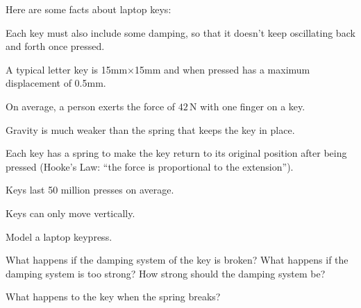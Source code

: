 \newpage

\question
	Here are some facts about laptop keys:

\begin{itemize}
\begin{minipage}{.4\textwidth}
\item[\color{Gray}(da)] Each key must also include some damping, so that it doesn't keep oscillating back and forth once pressed.

\item[\color{Gray}(di)] A typical letter key is 15mm$\times$15mm and when pressed has a maximum displacement of 0.5mm.

\item[\color{Gray}(fo)] On average, a person exerts the force of $42\,$N with one finger on a key.
\end{minipage}
\hfill
\begin{minipage}{.4\textwidth}
\item[\color{Gray}(gr)] Gravity is much weaker than the spring that keeps the key in place.

\item[\color{Gray}(hl)] Each key has a spring to make the key return to its original position after being pressed (Hooke's Law: ``the force is proportional to the extension'').

\item[\color{Gray}(lo)] Keys last 50 million presses on average.

\item[\color{Gray}(ve)] Keys can only move vertically.
\end{minipage}
\end{itemize}
	
	
\begin{parts}
	\item Model a laptop keypress.
	\item What happens if the damping system of the key is broken? What happens if the damping system is too strong? How strong should the damping system be?
	\item What happens to the key when the spring breaks?
\end{parts}









%
%



